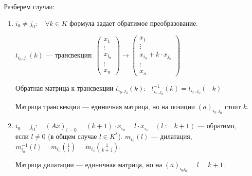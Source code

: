 Разберем случаи:
\begin{enumerate}
    \item $i_0 \neq j_0: \quad \forall k \in K$ формула задает обратимое преобразование.

    $t_{i_0, j_0}(k)$ --- трансвекция: $\begin{pmatrix} x_1 \\ \vdots \\ x_{i_0} \\ \vdots  \\ x_n \end{pmatrix} \to \begin{pmatrix} x_1 \\ \vdots \\ x_{i_0} + k \cdot x_{j_0} \\ \vdots  \\ x_n \end{pmatrix}$

    Обратная матрица к трансвекции $t_{i_0, j_0}(k)$: \ $t^{-1}_{i_0, j_0}(k) = t_{i_0, j_0}(-k)$

    Матрица трансвекции --- единичная матрица, но на позиции $(a)_{i_0, j_0}$ стоит $k$.

    \item $i_0 = j_0: \quad (Ax)_{i=0} = (k+1) \cdot x_{i_0} = l \cdot x_{i_0} \quad (l := k+1)$ --- обратимо, если $l \neq 0$ (в общем случае $l \in K^*$). $m_{i_0}(l)$ --- дилатация, $m_{i_0}^{-1}(l) = m_{i_0}(\frac{1}{l})=m_{i_0}(\frac{1}{k+1})$.

    Матрица дилатации --- единичная матрица, но на $(a)_{i_0 j_0} = l = k + 1$.
\end{enumerate}


